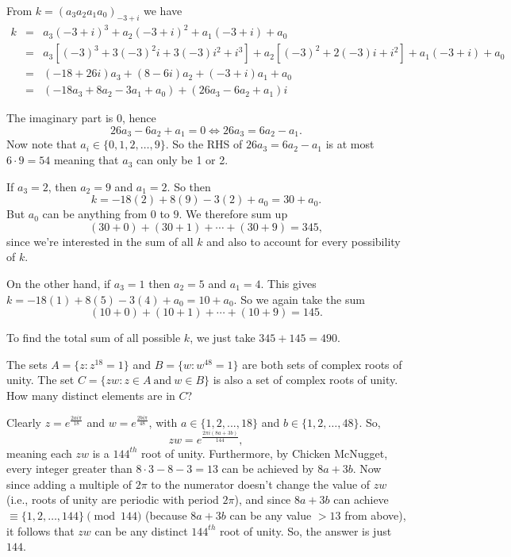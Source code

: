 \documentclass[11pt]{article}
\theoremstyle{definition}
\begin{document}
\begin{solution}[name={Solution by joml88}]
	From $k=(a_3a_2a_1a_0)_{-3+i}$ we have
	\begin{eqnarray*} k &=& a_3(-3+i)^3 + a_2(-3+i)^2 + a_1(-3+i) + a_0\\ &=& a_3\left[(-3)^3+3(-3)^2i+3(-3)i^2+i^3\right] + a_2\left[(-3)^2 + 2(-3)i + i^2\right] +a_1(-3+i) + a_0\\ &=& (-18 + 26i)a_3 + (8-6i)a_2 + (-3+i)a_1 + a_0\\ &=& (-18a_3+8a_2-3a_1+a_0) + (26a_3-6a_2+a_1)i \end{eqnarray*}
	
	The imaginary part is $0$, hence $$26a_3-6a_2+a_1=0\Leftrightarrow 26a_3=6a_2-a_1.$$ Now note that $a_i\in\{0,1,2,\ldots,9\}$. So the RHS of $26a_3 = 6a_2 -a_1$ is at most $6\cdot 9=54$ meaning that $a_3$ can only be 1 or 2.
	
	If $a_3=2$, then $a_2=9$ and $a_1=2$. So then $$k= -18(2) + 8(9) - 3(2) + a_0=30+a_0.$$ But $a_0$ can be anything from $0$ to $9$. We therefore sum up $$(30+0)+(30+1)+\cdots+(30+9)=345,$$ since we're interested in the sum of all $k$ and also to account for every possibility of $k$.
	
	On the other hand, if $a_3=1$ then $a_2=5$ and $a_1=4$. This gives $k= -18(1) + 8(5) - 3(4) + a_0 = 10+a_0$. So we again take the sum $$(10+0)+(10+1)+\cdots+(10+9)=145.$$
	
	To find the total sum of all possible $k$, we just take $345+145=\boxed{490}$.
\end{solution}







\begin{question}[name={1990 AIME, \href{https://artofproblemsolving.com/community/c4p459508}{Problem 10}}]
	The sets $A = \{z : z^{18} = 1\}$ and $B = \{w : w^{48} = 1\}$ are both sets of complex roots of unity. The set $C = \{zw : z \in A \ \text{and} \ w \in B\}$ is also a set of complex roots of unity. How many distinct elements are in $C$?	
\end{question}


\begin{solution}[name={Solution by cobbler}]
	Clearly $z=e^{\frac{2ai\pi}{18}}$ and $w=e^{\frac{2bi\pi}{48}}$, with $a\in \{1,2,...,18\}$ and $b\in \{1,2,\dots,48\}$. So, $$zw=e^{\frac{2\pi i(8a+3b)}{144}},$$ meaning each $zw$ is a $144^{th}$ root of unity. Furthermore, by Chicken McNugget, every integer greater than $8\cdot 3 - 8 - 3=13$ can be achieved by $8a+3b$. Now since adding a multiple of $2\pi$ to the numerator doesn't change the value of $zw$ (i.e., roots of unity are periodic with period $2\pi$), and since $8a+3b$ can achieve $\equiv \{1,2,\dots,144\}\pmod {144}$ (because $8a+3b$ can be any value $>13$ from above), it follows that $zw$ can be any distinct $144^{th}$ root of unity. So, the answer is just $\boxed{144}$.
\end{solution}
\end{document}
